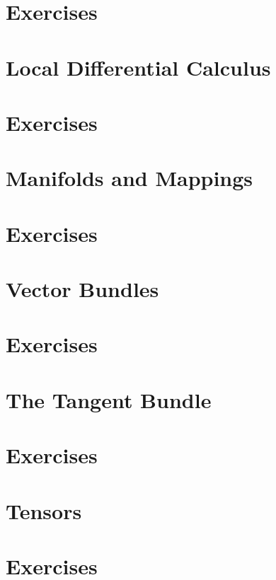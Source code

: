 \section*{Exercises}
\section{Local Differential Calculus}
\section*{Exercises}
\section{Manifolds and Mappings}
\section*{Exercises}
\section{Vector Bundles}
\section*{Exercises}
\section{The Tangent Bundle}
\section*{Exercises}
\section{Tensors}
\section*{Exercises}